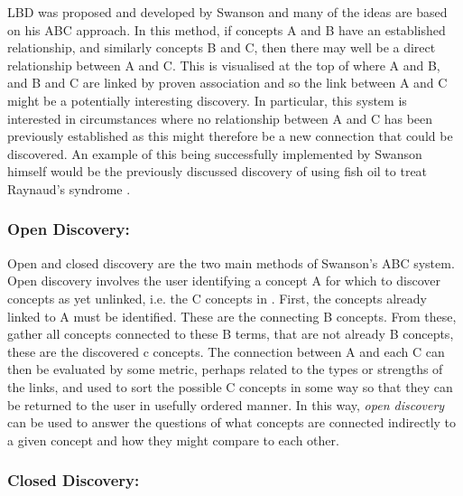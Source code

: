 \documentclass{l4proj}
\begin{document}
LBD was proposed and developed by Swanson \citep{smalheiser_rediscovering_2017} and many of the ideas are based on his ABC approach. In this method, if concepts A and B have an established relationship, and similarly concepts B and C, then there may well be a direct relationship between A and C. This is visualised at the top of  where A and B, and B and C are linked by proven association and so the link between A and C might be a potentially interesting discovery. In particular, this system is interested in circumstances where no relationship between A and C has been previously established as this might therefore be a new connection that could be discovered. An example of this being successfully implemented by Swanson himself would be the previously discussed discovery of using fish oil to treat Raynaud's syndrome \citep{swanson_fish_1986}. \\

\subsubsection{Open Discovery:}

Open and closed discovery are the two main methods of Swanson's ABC system. Open discovery involves the user identifying a concept A for which to discover concepts as yet unlinked, i.e. the C concepts in . First, the concepts already linked to A must be identified. These are the connecting B concepts. From these, gather all concepts connected to these B terms, that are not already B concepts, these are the discovered c concepts. The connection between A and each C can then be evaluated by some metric, perhaps related to the types or strengths of the links, and used to sort the possible C concepts in some way so that they can be returned to the user in usefully ordered manner. In this way, \textit{open discovery} can be used to answer the questions of what concepts are connected indirectly to a given concept and how they might compare to each other. \\

\subsubsection{Closed Discovery:}
\end{document}
